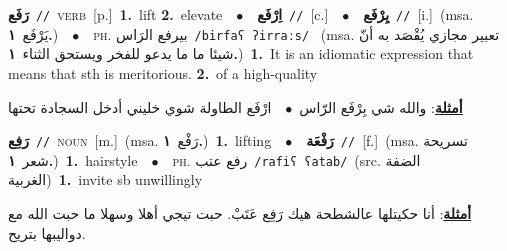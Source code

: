 \documentclass[10pt,a4paper,twoside]{article} %
\begin{document}
\begin{multicols}{2}
{\setlength\topsep{0pt}\textbf{\foreignlanguage{arabic}{رَفَع}}\ {\color{gray}\texttt{//}\color{black}}\ \textsc{verb}\ [p.]\ \textbf{1.}~lift  \textbf{2.}~elevate\ \ $\bullet$\ \ \setlength\topsep{0pt}\textbf{\foreignlanguage{arabic}{اِرْفَع}}\ {\color{gray}\texttt{//}\color{black}}\ [c.]\ \ $\bullet$\ \ \setlength\topsep{0pt}\textbf{\foreignlanguage{arabic}{يِرْفَع}}\ {\color{gray}\texttt{//}\color{black}}\ [i.]\ \color{gray}(msa. \foreignlanguage{arabic}{يَرْفَع}~\foreignlanguage{arabic}{\textbf{١.}})\color{black}\ \ $\bullet$\ \ \textsc{ph.} \color{gray} \foreignlanguage{arabic}{بيرفع الرَاس}\color{black}\ {\color{gray}\texttt{/{\sffamily birfaʕ ʔirraːs}/}\color{black}}\ \color{gray} (msa. \foreignlanguage{arabic}{تعبير مجازي يُقْصَد به أنّ شيئا ما ما يدعو للفخر ويستحق الثناء}~\foreignlanguage{arabic}{\textbf{١.}})\color{black}\ \textbf{1.}~It is an idiomatic expression that means that sth is meritorious.  \textbf{2.}~of a high-quality\  \begin{flushright}\color{gray}\foreignlanguage{arabic}{\textbf{\underline{\foreignlanguage{arabic}{أمثلة}}}: والله شي بِرْفَع الرّاس\ $\bullet$\ \  ارْفَع الطاولة شوي خليني أدخل السجادة تحتها}\end{flushright}\color{black}} \vspace{2mm}

{\setlength\topsep{0pt}\textbf{\foreignlanguage{arabic}{رَفِع}}\ {\color{gray}\texttt{//}\color{black}}\ \textsc{noun}\ [m.]\ \color{gray}(msa. \foreignlanguage{arabic}{رَفْع}~\foreignlanguage{arabic}{\textbf{١.}})\color{black}\ \textbf{1.}~lifting\ \ $\bullet$\ \ \setlength\topsep{0pt}\textbf{\foreignlanguage{arabic}{رَفْعَة}}\ {\color{gray}\texttt{//}\color{black}}\ [f.]\ \color{gray}(msa. \foreignlanguage{arabic}{تسريحة شعر}~\foreignlanguage{arabic}{\textbf{١.}})\color{black}\ \textbf{1.}~hairstyle\ \ $\bullet$\ \ \textsc{ph.} \color{gray} \foreignlanguage{arabic}{رفع عتب}\color{black}\ {\color{gray}\texttt{/{\sffamily rafiʕ ʕatab}/}\color{black}}\ \color{gray}(src. \foreignlanguage{arabic}{الضفة الغربية})\color{black}\ \textbf{1.}~invite sb unwillingly\  \begin{flushright}\color{gray}\foreignlanguage{arabic}{\textbf{\underline{\foreignlanguage{arabic}{أمثلة}}}: أنا حكيتلها عالشطحة هيك رَفِع عَتَبْ. حبت تيجي أهلا وسهلا ما حبت الله مع دواليبها بتريح.}\end{flushright}\color{black}} \vspace{2mm}


\end{multicols}
\end{document}
